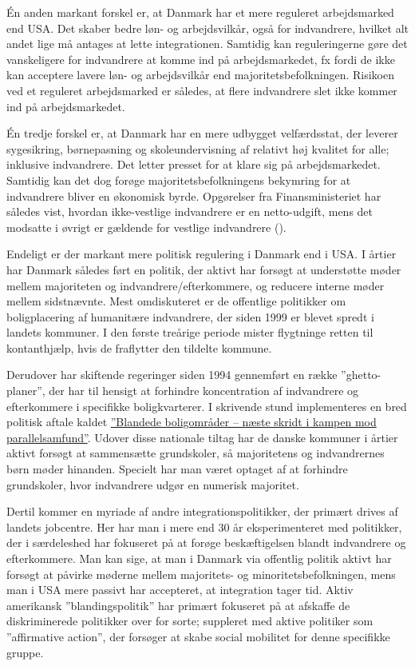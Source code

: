\documentclass[
]{book}
\begin{document}
Én anden markant forskel er, at Danmark har et mere reguleret arbejdsmarked end USA. Det skaber bedre løn- og arbejdsvilkår, også for indvandrere, hvilket alt andet lige må antages at lette integrationen. Samtidig kan reguleringerne gøre det vanskeligere for indvandrere at komme ind på arbejdsmarkedet, fx fordi de ikke kan acceptere lavere løn- og arbejdsvilkår end majoritetsbefolkningen. Risikoen ved et reguleret arbejdsmarked er således, at flere indvandrere slet ikke kommer ind på arbejdsmarkedet.

Én tredje forskel er, at Danmark har en mere udbygget velfærdsstat, der leverer sygesikring, børnepasning og skoleundervisning af relativt høj kvalitet for alle; inklusive indvandrere. Det letter presset for at klare sig på arbejdsmarkedet. Samtidig kan det dog forøge majoritetsbefolkningens bekymring for at indvandrere bliver en økonomisk byrde. Opgørelser fra Finansministeriet har således vist, hvordan ikke-vestlige indvandrere er en netto-udgift, mens det modsatte i øvrigt er gældende for vestlige indvandrere ().

Endeligt er der markant mere politisk regulering i Danmark end i USA. I årtier har Danmark således ført en politik, der aktivt har forsøgt at understøtte møder mellem majoriteten og indvandrere/efterkommere, og reducere interne møder mellem sidstnævnte. Mest omdiskuteret er de offentlige politikker om boligplacering af humanitære indvandrere, der siden 1999 er blevet spredt i landets kommuner. I den første treårige periode mister flygtninge retten til kontanthjælp, hvis de fraflytter den tildelte kommune.

Derudover har skiftende regeringer siden 1994 gennemført en række ''ghetto-planer'', der har til hensigt at forhindre koncentration af indvandrere og efterkommere i specifikke boligkvarterer. I skrivende stund implementeres en bred politisk aftale kaldet \href{https://www.sm.dk/media/24475/Pjece_Blandede\%20boligomr\%C3\%A5der.pdf}{''Blandede boligområder -- næste skridt i kampen mod parallelsamfund''}. Udover disse nationale tiltag har de danske kommuner i årtier aktivt forsøgt at sammensætte grundskoler, så majoritetens og indvandrernes børn møder hinanden. Specielt har man været optaget af at forhindre grundskoler, hvor indvandrere udgør en numerisk majoritet.

Dertil kommer en myriade af andre integrationspolitikker, der primært drives af landets jobcentre. Her har man i mere end 30 år eksperimenteret med politikker, der i særdeleshed har fokuseret på at forøge beskæftigelsen blandt indvandrere og efterkommere. Man kan sige, at man i Danmark via offentlig politik aktivt har forsøgt at påvirke møderne mellem majoritets- og minoritetsbefolkningen, mens man i USA mere passivt har accepteret, at integration tager tid. Aktiv amerikansk ''blandingspolitik'' har primært fokuseret på at afskaffe de diskriminerede politikker over for sorte; suppleret med aktive politiker som ''affirmative action'', der forsøger at skabe social mobilitet for denne specifikke gruppe.
\end{document}
